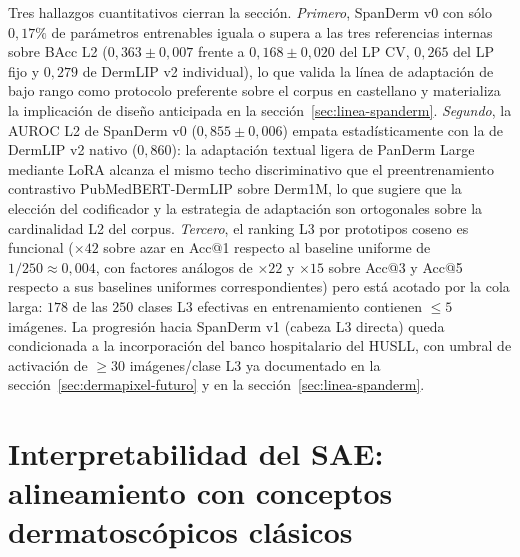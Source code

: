 Tres hallazgos cuantitativos cierran la sección. \textit{Primero},
SpanDerm v0 con sólo $0{,}17\%$ de parámetros entrenables iguala
o supera a las tres referencias internas sobre BAcc L2
($0{,}363 \pm 0{,}007$ frente a $0{,}168 \pm 0{,}020$ del LP
CV, $0{,}265$ del LP fijo y $0{,}279$ de DermLIP v2 individual),
lo que valida la línea de adaptación de bajo rango como protocolo
preferente sobre el corpus en castellano y materializa la
implicación de diseño anticipada en la
secci\'on~\ref{sec:linea-spanderm}. \textit{Segundo}, la AUROC L2
de SpanDerm v0 ($0{,}855 \pm 0{,}006$) empata estadísticamente
con la de DermLIP v2 nativo ($0{,}860$): la adaptación textual
ligera de PanDerm Large mediante LoRA alcanza el mismo techo
discriminativo que el preentrenamiento contrastivo
PubMedBERT-DermLIP sobre Derm1M, lo que sugiere que la elección
del codificador y la estrategia de adaptación son ortogonales
sobre la cardinalidad L2 del corpus. \textit{Tercero}, el ranking
L3 por prototipos coseno es funcional ($\times 42$ sobre azar en
Acc@1 respecto al baseline uniforme de $1/250 \approx 0{,}004$,
con factores análogos de $\times 22$ y $\times 15$ sobre Acc@3 y
Acc@5 respecto a sus baselines uniformes correspondientes) pero
está acotado por la cola larga: $178$ de las $250$ clases L3
efectivas en entrenamiento contienen $\leq 5$ imágenes. La progresión hacia SpanDerm v1
(cabeza L3 directa) queda condicionada a la incorporación del
banco hospitalario del HUSLL, con umbral de activación de
$\geq 30$ imágenes/clase L3 ya documentado en la
secci\'on~\ref{sec:dermapixel-futuro} y en la
secci\'on~\ref{sec:linea-spanderm}.

\section{Interpretabilidad del SAE: alineamiento con conceptos
dermatoscópicos clásicos}
\label{sec:sae-derm7pt}

